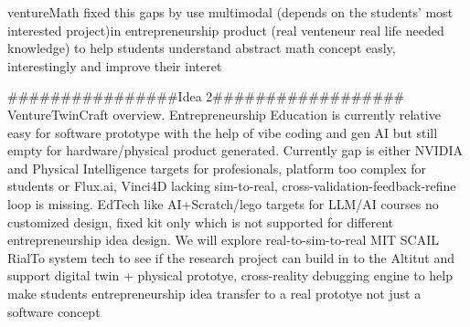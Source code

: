 ventureMath fixed this gaps by use multimodal (depends on the students’ most interested project)in entrepreneurship product (real venteneur real life needed knowledge) to help students understand abstract math concept easly, interestingly and improve their interet


################Idea 2##################
VentureTwinCraft overview.  Entrepreneurship Education is currently relative easy for software prototype with the help of vibe coding and gen AI but still empty for hardware/physical product generated.  Currently gap is either NVIDIA and Physical Intelligence targets for profesionals, platform too complex for students or  Flux.ai, Vinci4D  lacking sim-to-real, cross-validation-feedback-refine loop is missing. EdTech like AI+Scratch/lego targets for LLM/AI courses no customized design, fixed kit only which is not supported for different entrepreneurship idea design. We will explore real-to-sim-to-real MIT SCAIL RialTo system tech to see if the research project can build in to the Altitut and support digital twin + physical prototye, cross-reality debugging engine to help make students entrepreneurship idea transfer to a real prototye not just a software concept
